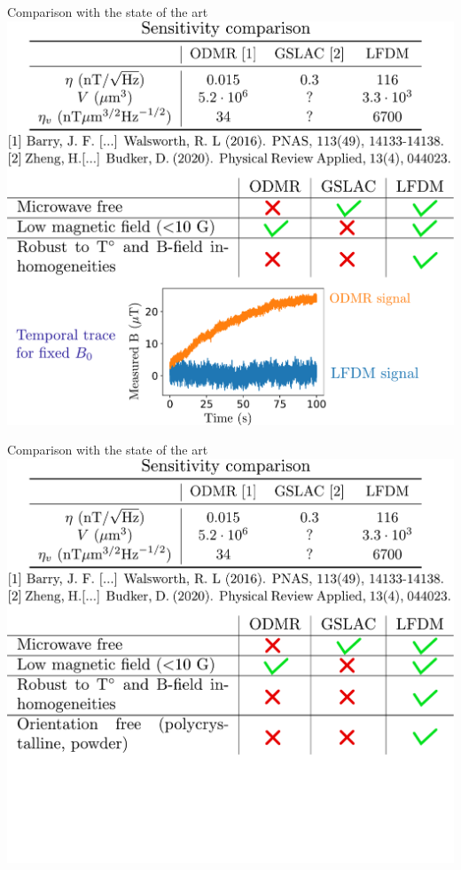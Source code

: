 \documentclass{beamer}
\begin{document}
\begin{frame}{Comparison with the state of the art}
\centering
\includegraphics[width=\textwidth,height=0.85\textheight,keepaspectratio]{Slide_comparison_litterature_f-1}
\end{frame}

\begin{frame}{Comparison with the state of the art}
\centering
\includegraphics[width=\textwidth,height=0.85\textheight,keepaspectratio]{Slide_comparison_litterature_f}
\end{frame}
\end{document}
